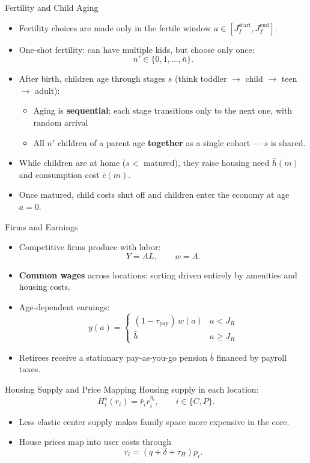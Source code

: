 \documentclass[11pt,aspectratio=169]{beamer}
\begin{document}
\begin{frame}{Fertility and Child Aging}
\begin{itemize}
  \item Fertility choices are made only in the fertile window $a \in [J_f^{\mathrm{start}},J_f^{\mathrm{end}}]$.
  \item One-shot fertility: can have multiple kids, but choose only once:
  \[
  n' \in \{0,1,\ldots,\bar n\}.
  \]
  \item After birth, children age through stages $s$ (think toddler $\to$ child $\to$ teen $\to$ adult):
  \begin{itemize}
    \item Aging is \textbf{sequential}: each stage transitions only to the next one, with random arrival
    \item All $n'$ children of a parent age \textbf{together} as a single cohort --- $s$ is shared.
  \end{itemize}
  \item While children are at home ($s < $ matured), they raise housing need $\bar h(m)$ and consumption cost $\bar c(m)$.
  \item Once matured, child costs shut off and children enter the economy at age $a=0$.
\end{itemize}
\end{frame}

\begin{frame}{Firms and Earnings}
\small
\begin{itemize}
  \item Competitive firms produce with labor:
  \[
  Y = A L, \qquad w = A.
  \]
  \item \textbf{Common wages} across locations: sorting driven entirely by amenities and housing costs.
  \item Age-dependent earnings:
  \[
  y(a) = \begin{cases} (1-\tau_{\mathrm{pay}})\,w(a) & a < J_R \\ \bar b & a \geq J_R \end{cases}
  \]
  \item Retirees receive a stationary pay-as-you-go pension $\bar b$ financed by payroll taxes.
\end{itemize}
\end{frame}


\begin{frame}{Housing Supply and Price Mapping}
\small
Housing supply in each location:
\[
H_i^s(r_i) = \bar r_i r_i^{\eta_i},
\qquad i \in \{C,P\}.
\]
\begin{itemize}
  \item Less elastic center supply makes family space more expensive in the core.
  \item House prices map into user costs through
  \[
  r_i = (q+\delta+\tau_H)p_i.
  \]

\end{itemize}
\end{frame}
\end{document}
